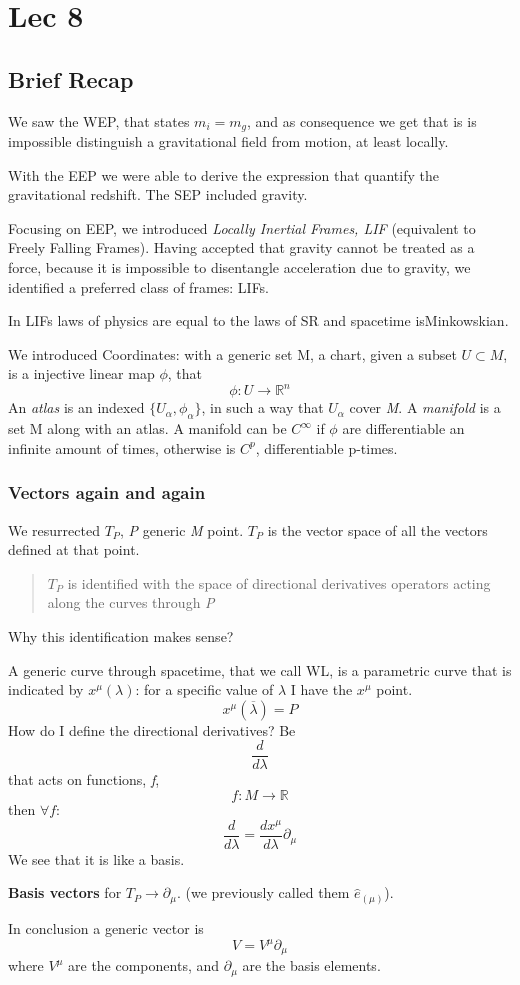 \section{Lec 8}
\subsection{Brief Recap}
We saw the WEP, that states $m_{i}= m_{g}$, and as consequence we get that is is impossible distinguish a gravitational field from motion, at least locally. \par
With the EEP we were able to derive the expression that quantify the gravitational redshift.
The SEP included gravity.\par

Focusing on EEP, we introduced \emph{Locally Inertial Frames, LIF} (equivalent to Freely Falling Frames).
Having accepted that gravity cannot be treated as a force, because it is impossible to disentangle acceleration due to gravity, we identified a preferred class of frames: LIFs.\par
In LIFs laws of physics are equal to the laws of SR and spacetime is\break Minkowskian.

We introduced Coordinates: with a generic set M, a chart, given a subset $U \subset M $, is a injective linear  map $\phi $, that \[
\phi : U \to \mathbb{R}^{n}
\]
An \emph{atlas }is an indexed $\{U_{\alpha}, \phi_{\alpha }\}$, in such a way that $U_{\alpha }$ cover \emph{M}.
A \emph{manifold} is a set M along with an atlas. A manifold can be $C^{\infty}$ if $\phi $ are differentiable an infinite amount of times, otherwise is $C^{p}$, differentiable p-times.
\subsubsection{Vectors again and again}
We resurrected $T_{P}$, \emph{P} generic \emph{M} point. $T_{P}$ is the vector space of all the vectors defined at that point.
\begin{quote}
$T_{P}$ is identified with the space of directional derivatives operators acting along the curves through \emph{P}
\end{quote}
Why this identification makes sense?\par
A generic curve through spacetime, that we call WL, is a parametric curve that is indicated by $x^{\mu }\left( \lambda  \right)$: for a specific value of $\lambda $ I have the $x^{\mu }$ point.
\[
x^{\mu }\left( \overline{\lambda } \right) = P
\]
How do I define the directional derivatives?
Be \[
\frac{d}{d\lambda }
\]
that acts on functions, \emph{f},
\[
f : M \to \mathbb{R}
\]
then $\forall f$:
\[
\frac{d}{d\lambda } = \frac{dx^{\mu }}{d\lambda }\partial_{\mu }
\]
We see that it is like a basis.\par
\textbf{Basis vectors } for $T_{P}\to \partial_{\mu }$. (we previously called them $\hat{e}_{\left( \mu  \right)}$). \par
In conclusion a generic vector is 
\[
V = V^{\mu }\partial_{\mu }
\]
where $V^{\mu }$ are the components, and $\partial_{\mu }$ are the basis elements.\par

